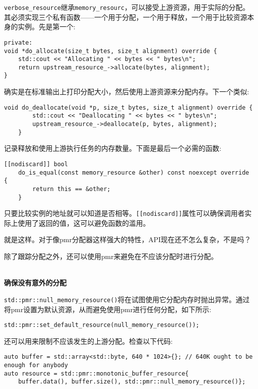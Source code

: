 \texttt{verbose\_resource}继承\texttt{memory\_resourc}，可以接受上游资源，用于实际的分配。其必须实现三个私有函数——一个用于分配，一个用于释放，一个用于比较资源本身的实例。先是第一个:

\begin{lstlisting}[style=styleCXX]
private:
void *do_allocate(size_t bytes, size_t alignment) override {
	std::cout << "Allocating " << bytes << " bytes\n";
	return upstream_resource_->allocate(bytes, alignment);
}
\end{lstlisting}

确实是在标准输出上打印分配大小，然后使用上游资源来分配内存。下一个类似:

\begin{lstlisting}[style=styleCXX]
	void do_deallocate(void *p, size_t bytes, size_t alignment) override {
		std::cout << "Deallocating " << bytes << " bytes\n";
		upstream_resource_->deallocate(p, bytes, alignment);
	}
\end{lstlisting}

记录释放和使用上游执行任务的内存数量。下面是最后一个必需的函数:

\begin{lstlisting}[style=styleCXX]
	[[nodiscard]] bool
	do_is_equal(const memory_resource &other) const noexcept override {
		return this == &other;
	}
\end{lstlisting}

只要比较实例的地址就可以知道是否相等。\texttt{[[nodiscard]]}属性可以确保调用者实际上使用了返回的值，这可以避免函数的滥用。

就是这样。对于像pmr分配器这样强大的特性，API现在还不怎么复杂，不是吗？

除了跟踪分配之外，还可以使用pmr来避免在不应该分配时进行分配。

\hspace*{\fill} \\ %
\noindent
\textbf{确保没有意外的分配}

\texttt{std::pmr::null\_memory\_resource()}将在试图使用它分配内存时抛出异常。通过将pmr设置为默认资源，从而避免使用pmr进行任何分配，如下所示:

\begin{lstlisting}[style=styleCXX]
std::pmr::set_default_resource(null_memory_resource());
\end{lstlisting}

还可以用来限制不应该发生的上游分配。检查以下代码:

\begin{lstlisting}[style=styleCXX]
auto buffer = std::array<std::byte, 640 * 1024>{}; // 640K ought to be
enough for anybody
auto resource = std::pmr::monotonic_buffer_resource{
	buffer.data(), buffer.size(), std::pmr::null_memory_resource()};
\end{lstlisting}

